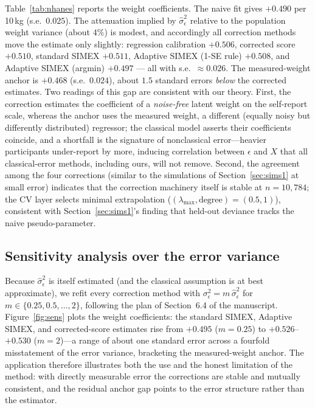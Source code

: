 Table~\ref{tab:nhanes} reports the weight coefficients. The naive fit
gives $+0.490$ per 10\,kg (s.e.\ $0.025$). The attenuation implied by
$\hat\sigma^2_\epsilon$ relative to the population weight variance
(about $4\%$) is modest, and accordingly all correction methods move
the estimate only slightly: regression calibration $+0.506$, corrected
score $+0.510$, standard SIMEX $+0.511$, Adaptive SIMEX (1-SE rule)
$+0.508$, and Adaptive SIMEX (argmin) $+0.497$ --- all with s.e.\
$\approx0.026$. The measured-weight anchor is $+0.468$ (s.e.\ $0.024$),
about $1.5$ standard errors \emph{below} the corrected estimates. Two
readings of this gap are consistent with our theory. First, the
correction estimates the coefficient of a \emph{noise-free} latent
weight on the self-report scale, whereas the anchor uses the measured
weight, a different (equally noisy but differently distributed)
regressor; the classical model asserts their coefficients coincide, and
a shortfall is the signature of nonclassical error---heavier
participants under-report by more, inducing correlation between
$\epsilon$ and $X$ that all classical-error methods, including ours,
will not remove. Second, the agreement among the four corrections
(similar to the simulations of Section~\ref{sec:sims1} at small error)
indicates that the correction machinery itself is stable at
$n=10{,}784$; the CV layer selects minimal extrapolation
($(\lambda_{\max},\text{degree})=(0.5,1)$), consistent with
Section~\ref{sec:sims1}'s finding that held-out deviance tracks the
naive pseudo-parameter.



\subsection{Sensitivity analysis over the error variance}
\label{sec:app-sens}

Because $\hat\sigma^2_\epsilon$ is itself estimated (and the classical
assumption is at best approximate), we refit every correction method
with $\sigma^2_\epsilon = m\,\hat\sigma^2_\epsilon$ for
$m\in\{0.25,0.5,\dots,2\}$, following the plan of
Section~6.4 of the manuscript. Figure~\ref{fig:sens} plots the weight
coefficients: the standard SIMEX, Adaptive SIMEX, and corrected-score
estimates rise from $+0.495$ ($m=0.25$) to $+0.526$--$+0.530$
($m=2$)---a range of about one standard error across a fourfold
misstatement of the error variance, bracketing the measured-weight
anchor. The application therefore illustrates both the use and the
honest limitation of the method: with directly measurable error the
corrections are stable and mutually consistent, and the residual
anchor gap points to the error structure rather than the estimator.

